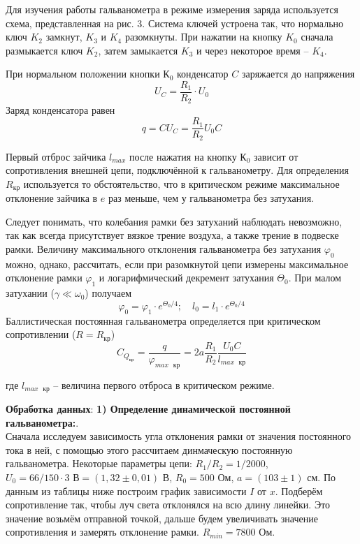 \documentclass[a4paper,12pt]{article}
\begin{document}
Для изучения работы гальванометра в режиме измерения заряда используется схема, представленная на рис. 3. Система ключей устроена так, что нормально ключ $K_2$ замкнут, $K_3$ и $K_4$ разомкнуты. При нажатии на кнопку $K_0$ сначала размыкается ключ $K_2$, затем замыкается $K_3$ и через некоторое время -- $K_4$. 

При нормальном положении кнопки $К_0$ конденсатор $C$ заряжается до напряжения
\[U_C = \frac{R_1}{R_2} \cdot U_0\]
Заряд конденсатора равен 
\[q = C U_C = \frac{R_1}{R_2} U_0 C\]

Первый отброс зайчика $l_{max}$ после нажатия на кнопку $К_0$ зависит от сопротивления внешней цепи, подключённой к гальванометру. Для определения
$R_{кр}$ используется то обстоятельство, что в критическом режиме максимальное отклонение зайчика в $e$ раз меньше, чем у гальванометра без затухания.

Следует понимать, что колебания рамки без затуханий наблюдать невозможно, так как всегда присутствует вязкое трение воздуха, а также трение в подвеске рамки. Величину максимального отклонения гальванометра без затухания $\varphi_0$ можно, однако, рассчитать, если при разомкнутой цепи измерены максимальное отклонение рамки $\varphi_1$ и логарифмический декремент затухания $\Theta_0$. При малом затухании ($\gamma \ll \omega_0$) получаем
\[\varphi_0 = \varphi_1 \cdot e^{\Theta_0 / 4}; \quad l_0 = l_1 \cdot e^{\Theta_0 / 4}\]
Баллистическая постоянная гальванометра определяется при критическом сопротивлении ($R = R_{кр}$)
\begin{equation}\label{eq: BallistConst}
    C_{Q_{кр}} = \frac{q}{\varphi_{max \text{ } кр}} = 2a\frac{R_1}{R_2} \frac{U_0 C}{l_{max \text{ } кр}}
\end{equation}

где $l_{max \text{ } кр}$ -- величина первого отброса в критическом режиме.

\textbf{Обработка данных}: 
\textbf{1) Определение динамической постоянной гальванометра:}. \\
Сначала исследуем зависимость угла отклонения рамки от значения постоянного тока в ней, с помощью этого рассчитаем динмаческую постоянную гальванометра. Некоторые параметры цепи: $R_1 / R_2 = 1 / 2000$, $U_0 = 66 / 150 \cdot 3 \text{ В} = (1,32 \pm 0,01)\text{ В}$, $R_0 = 500 \text{ Ом}$, $a = (103 \pm 1)\text{ см}$. По данным из таблицы ниже построим график зависимости $I$ от $x$. Подберём сопротивление так, чтобы луч света отклонялся на всю длину линейки. Это значение возьмём отправной точкой, дальше будем увеличивать значение сопротивления и замерять отклонение рамки. $R_{min} = 7800$ Ом.
\end{document}
